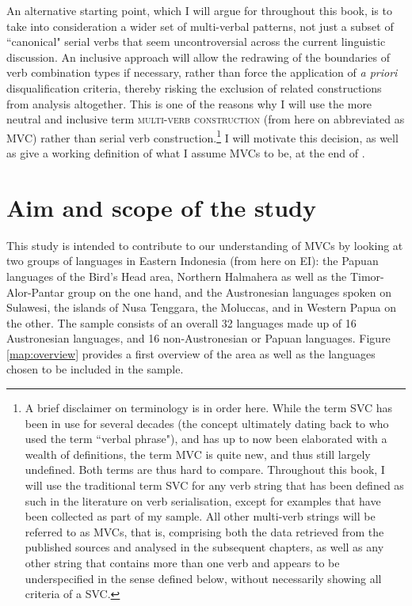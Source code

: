 An alternative starting point, which I will argue for throughout this book, is to take into consideration a wider set of multi-verbal patterns, not just a subset of ``canonical" serial verbs that seem uncontroversial across the current linguistic discussion. An inclusive approach will allow the redrawing of the boundaries of verb combination types if necessary, rather than force the application of \textit{a priori} disqualification criteria, thereby risking the exclusion of related constructions from analysis altogether. This is one of the reasons why I will use the more neutral and inclusive term \textsc{multi-verb construction} (from here on abbreviated as MVC) rather than serial verb construction.\footnote{A brief disclaimer on terminology is in order here. While the term SVC has been in use for several decades (the concept ultimately dating back to \citealt{christaller1875} who used the term ``verbal phrase"), and has up to now been elaborated with a wealth of definitions, the term MVC is quite new, and thus still largely undefined. Both terms are thus hard to compare. Throughout this book, I will use the traditional term SVC for any verb string that has been defined as such in the literature on verb serialisation, except for examples that have been collected as part of my sample. All other multi-verb strings will be referred to as MVCs, that is, comprising both the data retrieved from the published sources and analysed in the subsequent chapters, as well as any other string that contains more than one verb and appears to be underspecified in the sense defined below, without necessarily showing all criteria of a SVC.} I will motivate this decision, as well as give a working definition of what I assume MVCs to be, at the end of .

\section{Aim and scope of the study}

This study is intended to contribute to our understanding of MVCs by looking at two groups of languages in Eastern Indonesia (from here on EI): the Papuan languages of the Bird's Head area, Northern Halmahera as well as the Timor-Alor-Pantar group on the one hand, and the Austronesian languages spoken on Sulawesi, the islands of Nusa Tenggara, the Moluccas, and in Western Papua on the other. The sample consists of an overall 32 languages made up of 16 Austronesian languages, and 16 non-Austronesian or Papuan languages. Figure \ref{map:overview} provides a first overview of the area as well as the languages chosen to be included in the sample.

